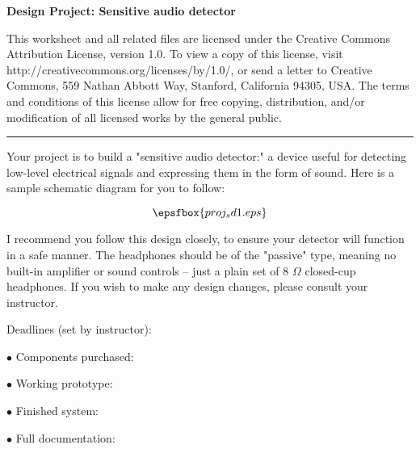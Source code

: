 
\centerline{\bf Design Project: Sensitive audio detector} \bigskip 
 
This worksheet and all related files are licensed under the Creative Commons Attribution License, version 1.0.  To view a copy of this license, visit http://creativecommons.org/licenses/by/1.0/, or send a letter to Creative Commons, 559 Nathan Abbott Way, Stanford, California 94305, USA.  The terms and conditions of this license allow for free copying, distribution, and/or modification of all licensed works by the general public.

\bigskip 

\hrule

\vskip 10pt

Your project is to build a "sensitive audio detector:" a device useful for detecting low-level electrical signals and expressing them in the form of sound.  Here is a sample schematic diagram for you to follow:

$$\epsfbox{proj_sd1.eps}$$

I recommend you follow this design closely, to ensure your detector will function in a safe manner.  The headphones should be of the "passive" type, meaning no built-in amplifier or sound controls -- just a plain set of 8 $\Omega$ closed-cup headphones.  If you wish to make any design changes, please consult your instructor.

\vskip 10pt

\noindent
Deadlines (set by instructor):

\medskip
\item{$\bullet$} Components purchased:
\item{$\bullet$} Working prototype:
\item{$\bullet$} Finished system:
\item{$\bullet$} Full documentation:
\medskip



